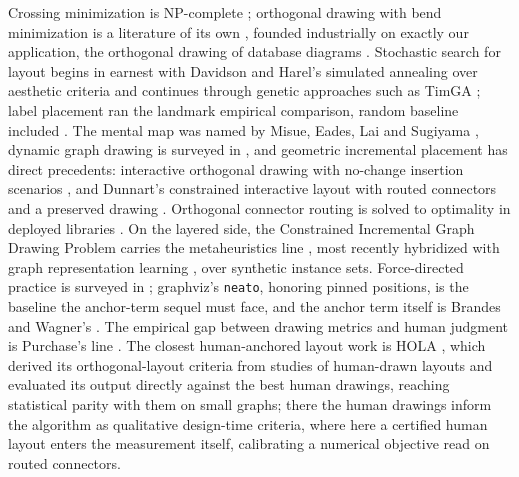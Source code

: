 \documentclass[11pt]{article}
\begin{document}
Crossing minimization is NP-complete \cite{gj83}; orthogonal drawing with bend
minimization is a literature of its own \cite{tamassia87}, founded industrially on exactly
our application, the orthogonal drawing of database diagrams \cite{tdb88}. Stochastic
search for layout begins in earnest with Davidson and Harel's simulated annealing over
aesthetic criteria \cite{dh96} and continues through genetic approaches such as TimGA
\cite{timga}; label placement ran the landmark empirical comparison, random baseline
included \cite{cms95}. The mental map was named by Misue, Eades, Lai and Sugiyama
\cite{misue95}, dynamic graph drawing is surveyed in \cite{beck17}, and geometric
incremental placement has direct precedents: interactive orthogonal drawing with no-change
insertion scenarios \cite{pt98}, and Dunnart's constrained interactive layout with routed
connectors and a preserved drawing \cite{dunnart}. Orthogonal connector routing is solved
to optimality in deployed libraries \cite{wms09}. On the layered side, the Constrained
Incremental Graph Drawing Problem carries the metaheuristics line \cite{marti18,cigdp19},
most recently hybridized with graph representation learning \cite{cigdp2025}, over
synthetic instance sets. Force-directed practice is surveyed in \cite{kobourov};
graphviz's \texttt{neato}, honoring pinned positions, is the baseline the anchor-term
sequel must face, and the anchor term itself is Brandes and Wagner's \cite{bw97}. The
empirical gap between drawing metrics and human judgment is
Purchase's line \cite{purchase02}. The closest human-anchored layout work is HOLA
\cite{hola16}, which derived its orthogonal-layout criteria from studies of human-drawn
layouts and evaluated its output directly against the best human drawings, reaching
statistical parity with them on small graphs; there the human drawings inform the algorithm
as qualitative design-time criteria, where here a certified human layout enters the
measurement itself, calibrating a numerical objective read on routed connectors.
\end{document}
